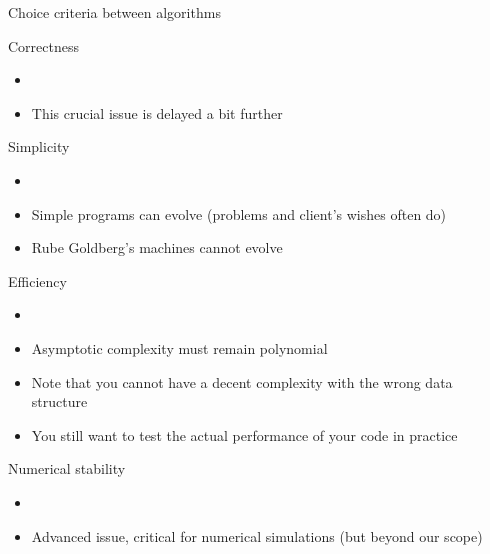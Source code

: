 \begin{frame}[squeeze]{Choice criteria between algorithms}
  \begin{block}{Correctness}
    \begin{itemize}
    \item {}
    \item This crucial issue is delayed a bit further
    \end{itemize}
  \end{block}\vspace{-.6\baselineskip}
  \begin{block}{Simplicity}
    \begin{itemize}
    \item {}
    \item Simple programs can evolve (problems and client's wishes often do)
    \item Rube Goldberg's machines cannot evolve
    \end{itemize}
  \end{block}\vspace{-.6\baselineskip}
  \begin{block}{Efficiency}
    \begin{itemize}
    \item {}
    \item Asymptotic complexity must remain polynomial
    \item Note that you cannot have a decent complexity with the wrong
      data structure
    \item You still want to test the actual performance of your code in practice
    \end{itemize}
  \end{block}\vspace{-.6\baselineskip}
  \begin{block}{Numerical stability}
    \begin{itemize}
    \item {}
    \item Advanced issue, critical for numerical simulations (but beyond our
      scope)
    \end{itemize}
  \end{block}
\end{frame}